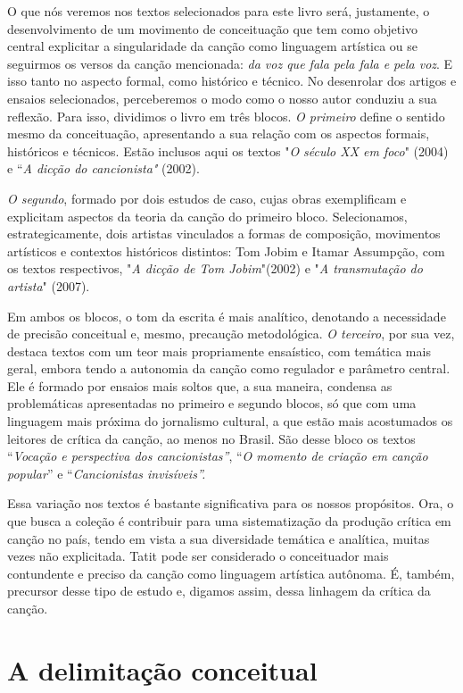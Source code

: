 O que nós veremos nos textos selecionados para este livro será,
justamente, o desenvolvimento de um movimento de conceituação que tem
como objetivo central explicitar a singularidade da canção como
linguagem artística ou se seguirmos os versos da canção mencionada:
\emph{da voz que fala pela fala e pela voz}. E isso tanto no aspecto
formal, como histórico e técnico. No desenrolar dos artigos e ensaios
selecionados, perceberemos o modo como o nosso autor conduziu a sua
reflexão. Para isso, dividimos o livro em três blocos. \emph{O primeiro}
define o sentido mesmo da conceituação, apresentando a sua relação com
os aspectos formais, históricos e técnicos. Estão inclusos aqui os
textos "\emph{O século XX em foco}" (2004) e ``\emph{A dicção do
cancionista"} (2002).

\emph{O segundo}, formado por dois estudos de caso, cujas obras
exemplificam e explicitam aspectos da teoria da canção do primeiro
bloco. Selecionamos, estrategicamente, dois artistas vinculados a formas
de composição, movimentos artísticos e contextos históricos distintos:
Tom Jobim e Itamar Assumpção, com os textos respectivos, "\emph{A dicção
de Tom Jobim}"(2002) e "\emph{A transmutação do artista}" (2007).

Em ambos os blocos, o tom da escrita é mais analítico, denotando a
necessidade de precisão conceitual e, mesmo, precaução metodológica.
\emph{O terceiro}, por sua vez, destaca textos com um teor mais
propriamente ensaístico, com temática mais geral, embora tendo a
autonomia da canção como regulador e parâmetro central. Ele é formado
por ensaios mais soltos que, a sua maneira, condensa as problemáticas
apresentadas no primeiro e segundo blocos, só que com uma linguagem mais
próxima do jornalismo cultural, a que estão mais acostumados os leitores
de crítica da canção, ao menos no Brasil. São desse bloco os textos
``\emph{Vocação e perspectiva dos cancionistas''}, ``\emph{O momento de
criação em canção popular}'' e ``\emph{Cancionistas invisíveis''.}

Essa variação nos textos é bastante significativa para os nossos
propósitos. Ora, o que busca a coleção é contribuir para uma
sistematização da produção crítica em canção no país, tendo em vista a
sua diversidade temática e analítica, muitas vezes não explicitada.
Tatit pode ser considerado o conceituador mais contundente e preciso da
canção como linguagem artística autônoma. É, também, precursor desse
tipo de estudo e, digamos assim, dessa linhagem da crítica da canção.

\section{A delimitação conceitual}

